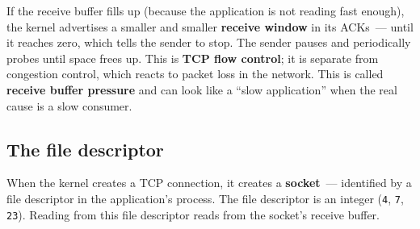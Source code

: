 \noindent{}If the receive buffer fills up (because the application is not reading fast enough), the kernel advertises a smaller and smaller \textbf{receive window} in its ACKs~--- until it reaches zero, which tells the sender to stop. The sender pauses and periodically probes until space frees up. This is \textbf{TCP flow control}; it is separate from congestion control, which reacts to packet loss in the network. This is called \textbf{receive buffer pressure} and can look like a ``slow application'' when the real cause is a slow consumer.

\subsection*{The file descriptor}\label{26-network-stack-flow:the-file-descriptor}

When the kernel creates a TCP connection, it creates a \textbf{socket}~--- identified by a file descriptor in the application's process. The file descriptor is an integer (\texttt{4}, \texttt{7}, \texttt{23}). Reading from this file descriptor reads from the socket's receive buffer.

\begin{codebox}[short]

\begin{Shaded}
\begin{Highlighting}[]

\OperatorTok{=}
\NormalTok{, }\NormalTok{))}
\NormalTok{)}

\OperatorTok{=}

\OperatorTok{=}\NormalTok{)}
\end{Highlighting}
\end{Shaded}

\end{codebox}

